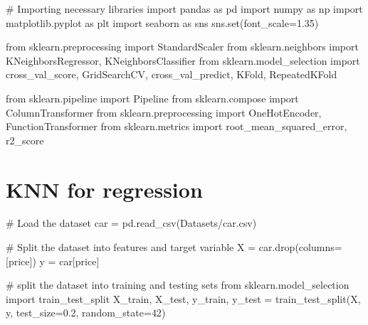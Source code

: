 \documentclass[
  letterpaper,
  DIV=11,
  numbers=noendperiod]{scrreprt}
\newenvironment{Shaded}{\begin{snugshade}}{\end{snugshade}}
\newcommand{\BuiltInTok}[1]{\textcolor[rgb]{0.00,0.23,0.31}{#1}}
\newcommand{\CommentTok}[1]{\textcolor[rgb]{0.37,0.37,0.37}{#1}}
\newcommand{\DecValTok}[1]{\textcolor[rgb]{0.68,0.00,0.00}{#1}}
\newcommand{\FloatTok}[1]{\textcolor[rgb]{0.68,0.00,0.00}{#1}}
\newcommand{\ImportTok}[1]{\textcolor[rgb]{0.00,0.46,0.62}{#1}}
\newcommand{\NormalTok}[1]{\textcolor[rgb]{0.00,0.23,0.31}{#1}}
\newcommand{\OperatorTok}[1]{\textcolor[rgb]{0.37,0.37,0.37}{#1}}
\newcommand{\StringTok}[1]{\textcolor[rgb]{0.13,0.47,0.30}{#1}}
\begin{document}
\begin{Shaded}
\begin{Highlighting}[]
\CommentTok{\# Importing necessary libraries}
\ImportTok{import}\NormalTok{ pandas }\ImportTok{as}\NormalTok{ pd}
\ImportTok{import}\NormalTok{ numpy }\ImportTok{as}\NormalTok{ np}
\ImportTok{import}\NormalTok{ matplotlib.pyplot }\ImportTok{as}\NormalTok{ plt}
\ImportTok{import}\NormalTok{ seaborn }\ImportTok{as}\NormalTok{ sns}
\NormalTok{sns.}\BuiltInTok{set}\NormalTok{(font\_scale}\OperatorTok{=}\FloatTok{1.35}\NormalTok{)}

\ImportTok{from}\NormalTok{ sklearn.preprocessing }\ImportTok{import}\NormalTok{ StandardScaler}
\ImportTok{from}\NormalTok{ sklearn.neighbors }\ImportTok{import}\NormalTok{ KNeighborsRegressor, KNeighborsClassifier}
\ImportTok{from}\NormalTok{ sklearn.model\_selection }\ImportTok{import}\NormalTok{ cross\_val\_score, GridSearchCV, cross\_val\_predict, KFold, RepeatedKFold}

\ImportTok{from}\NormalTok{ sklearn.pipeline }\ImportTok{import}\NormalTok{ Pipeline}
\ImportTok{from}\NormalTok{ sklearn.compose }\ImportTok{import}\NormalTok{ ColumnTransformer}
\ImportTok{from}\NormalTok{ sklearn.preprocessing }\ImportTok{import}\NormalTok{ OneHotEncoder, FunctionTransformer}
\ImportTok{from}\NormalTok{ sklearn.metrics }\ImportTok{import}\NormalTok{ root\_mean\_squared\_error, r2\_score}
\end{Highlighting}
\end{Shaded}

\section{KNN for regression}\label{knn-for-regression}

\begin{Shaded}
\begin{Highlighting}[]
\CommentTok{\# Load the dataset}
\NormalTok{car }\OperatorTok{=}\NormalTok{ pd.read\_csv(}\StringTok{\textquotesingle{}Datasets/car.csv\textquotesingle{}}\NormalTok{)}

\CommentTok{\# Split the dataset into features and target variable}
\NormalTok{X }\OperatorTok{=}\NormalTok{ car.drop(columns}\OperatorTok{=}\NormalTok{[}\StringTok{\textquotesingle{}price\textquotesingle{}}\NormalTok{])}
\NormalTok{y }\OperatorTok{=}\NormalTok{ car[}\StringTok{\textquotesingle{}price\textquotesingle{}}\NormalTok{]}

\CommentTok{\# split the dataset into training and testing sets}
\ImportTok{from}\NormalTok{ sklearn.model\_selection }\ImportTok{import}\NormalTok{ train\_test\_split}
\NormalTok{X\_train, X\_test, y\_train, y\_test }\OperatorTok{=}\NormalTok{ train\_test\_split(X, y, test\_size}\OperatorTok{=}\FloatTok{0.2}\NormalTok{, random\_state}\OperatorTok{=}\DecValTok{42}\NormalTok{)}
\end{Highlighting}
\end{Shaded}
\end{document}
